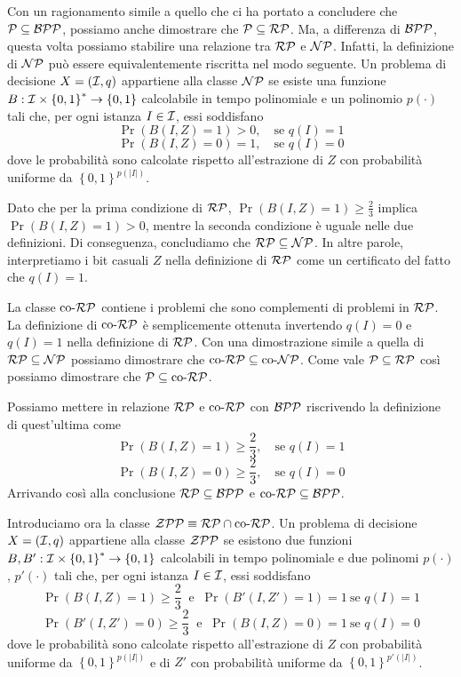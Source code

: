 Con un ragionamento simile a quello che ci ha portato a concludere che $\mathcal{P} \subseteq \mathcal{BPP}$, possiamo anche dimostrare che $\mathcal{P} \subseteq \mathcal{RP}$. Ma, a differenza di $\mathcal{BPP}$, questa volta possiamo stabilire una relazione tra $\mathcal{RP}$ e $\mathcal{NP}$. Infatti, la definizione di $\mathcal{NP}$ può essere equivalentemente riscritta nel modo seguente. Un problema di decisione $X = (\mathcal{I}, q)$ appartiene alla classe $\mathcal{NP}$ se esiste una funzione $B: \mathcal{I} \times \left\{0,1\right\}^\ast \rightarrow \left\{0,1\right\}$ calcolabile in tempo polinomiale e un polinomio $p(\cdot)$ tali che, per ogni istanza $I \in \mathcal{I}$, essi soddisfano
$$ \Pr \left(B(I, Z) = 1\right) > 0, \quad \text{se } q(I) = 1 $$
$$ \Pr \left(B(I, Z) = 0\right) = 1, \quad \text{se } q(I) = 0 $$
dove le probabilità sono calcolate rispetto all'estrazione di $Z$ con probabilità uniforme da $\left\{0,1\right\}^{p(|I|)}$.

Dato che per la prima condizione di $\mathcal{RP}$, $\Pr \left(B(I,Z) = 1\right) \geq \frac{2}{3}$ implica $\Pr \left(B(I,Z) = 1\right) > 0$, mentre la seconda condizione è uguale nelle due definizioni. Di conseguenza, concludiamo che $\mathcal{RP} \subseteq \mathcal{NP}$. In altre parole, interpretiamo i bit casuali $Z$ nella definizione di $\mathcal{RP}$ come un certificato del fatto che $q(I) = 1$.

La classe $\text{co-}\mathcal{RP}$ contiene i problemi che sono complementi di problemi in $\mathcal{RP}$. La definizione di $\text{co-}\mathcal{RP}$ è semplicemente ottenuta invertendo $q(I) = 0$ e $q(I) = 1$ nella definizione di $\mathcal{RP}$. Con una dimostrazione simile a quella di $\mathcal{RP} \subseteq \mathcal{NP}$ possiamo dimostrare che $\text{co-}\mathcal{RP} \subseteq \text{co-}\mathcal{NP}$. Come vale $\mathcal{P} \subseteq \mathcal{RP}$ così possiamo dimostrare che $\mathcal{P} \subseteq \text{co-}\mathcal{RP}$.

Possiamo mettere in relazione $\mathcal{RP}$ e $\text{co-}\mathcal{RP}$ con $\mathcal{BPP}$ riscrivendo la definizione di quest'ultima come
$$ \Pr \left(B(I, Z) = 1\right) \geq \frac{2}{3}, \quad \text{se } q(I) = 1 $$
$$ \Pr \left(B(I, Z) = 0\right) \geq \frac{2}{3}, \quad \text{se } q(I) = 0 $$
Arrivando così alla conclusione $\mathcal{RP} \subseteq \mathcal{BPP}$ e $\text{co-}\mathcal{RP} \subseteq \mathcal{BPP}$.

Introduciamo ora la classe $\mathcal{ZPP} \equiv \mathcal{RP} \cap \text{co-}\mathcal{RP}$. Un problema di decisione $X = (\mathcal{I}, q)$ appartiene alla classe $\mathcal{ZPP}$ se esistono due funzioni $B, B': \mathcal{I} \times \left\{0,1\right\}^\ast \rightarrow \left\{0,1\right\}$ calcolabili in tempo polinomiale e due polinomi $p(\cdot)$, $p'(\cdot)$ tali che, per ogni istanza $I \in \mathcal{I}$, essi soddisfano
$$ \Pr \left(B(I, Z) = 1\right) \geq \frac{2}{3} \ \text{ e } \ \Pr\left(B' (I, Z') = 1\right) = 1 \ \text{se } q(I) = 1 $$
$$ \Pr \left(B'(I, Z') = 0\right) \geq \frac{2}{3} \ \text{ e } \ \Pr\left(B (I, Z) = 0\right) = 1 \ \text{se } q(I) = 0 $$
dove le probabilità sono calcolate rispetto all'estrazione di $Z$ con probabilità uniforme da $\left\{0,1\right\}^{p(|I|)}$ e di $Z'$ con probabilità uniforme da $\left\{0,1\right\}^{p'(|I|)}$.

